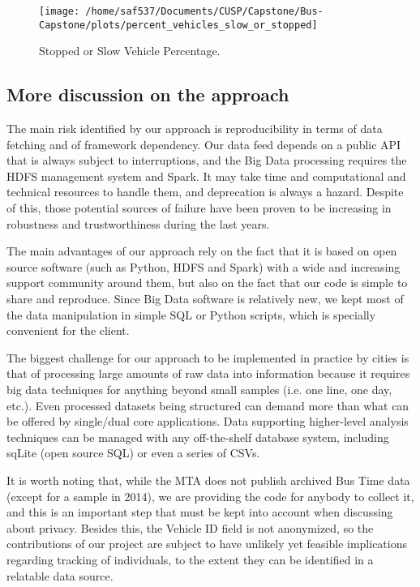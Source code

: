 \documentclass[12pt]{report}
\begin{document}
\begin{itemize}
\begin{figure}[!ht]
  \caption{Stopped or Slow Vehicle Percentage.}
  \label{stopped_slow}
  \centering
    \texttt{[image: /home/saf537/Documents/CUSP/Capstone/Bus-Capstone/plots/percent\_vehicles\_slow\_or\_stopped]}
\end{figure}




\end{itemize}


\subsection{More discussion on the approach}

The main risk identified by our approach is reproducibility in terms of data fetching and of framework dependency. Our data feed depends on a public API that is always subject to interruptions, and the Big Data processing requires the HDFS management system and Spark. It may take time and computational and technical resources to handle them, and deprecation is always a hazard. Despite of this, those potential sources of failure have been proven to be increasing in robustness and trustworthiness during the last years.

The main advantages of our approach rely on the fact that it is based on open source software (such as Python, HDFS and Spark) with a wide and increasing support community around them, but also on the fact that our code is simple to share and reproduce. Since Big Data software is relatively new, we kept most of the data manipulation in simple SQL or Python scripts, which is specially convenient for the client.

The biggest challenge for our approach to be implemented in practice by cities is that of processing large amounts of raw data into information because it requires big data techniques for anything beyond small samples (i.e. one line, one day, etc.). Even processed datasets being structured can demand more than what can be offered by single/dual core applications. Data supporting higher-level analysis techniques can be managed with any off-the-shelf database system, including sqLite (open source SQL) or even a series of CSVs.

It is worth noting that, while the MTA does not publish archived Bus Time data (except for a sample in 2014), we are providing the code for anybody to collect it, and this is an important step that must be kept into account when discussing about privacy.  Besides this, the Vehicle ID field is not anonymized, so the contributions of our project are subject to have unlikely yet feasible implications regarding tracking of individuals, to the extent they can be identified in a relatable data source.
\end{document}

